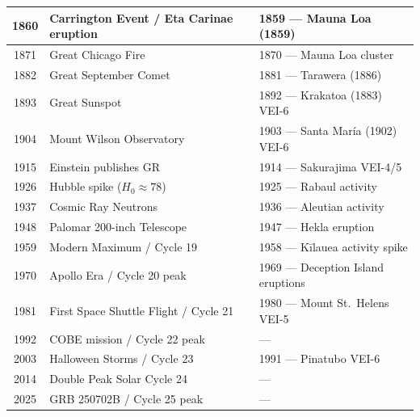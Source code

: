 \documentclass[11pt,a4paper]{article}
\begin{document}
\begin{longtable}{|c|p{5cm}|p{5cm}|}
1860 & Carrington Event / Eta Carinae eruption & 1859 --- Mauna Loa (1859) \\ \hline
1871 & Great Chicago Fire & 1870 --- Mauna Loa cluster \\ \hline
1882 & Great September Comet & 1881 --- Tarawera (1886) \\ \hline
1893 & Great Sunspot & 1892 --- Krakatoa (1883) VEI-6 \\ \hline
1904 & Mount Wilson Observatory & 1903 --- Santa María (1902) VEI-6 \\ \hline
1915 & Einstein publishes GR & 1914 --- Sakurajima VEI-4/5 \\ \hline
1926 & Hubble spike ($H_0\approx78$) & 1925 --- Rabaul activity \\ \hline
1937 & Cosmic Ray Neutrons & 1936 --- Aleutian activity \\ \hline
1948 & Palomar 200-inch Telescope & 1947 --- Hekla eruption \\ \hline
1959 & Modern Maximum / Cycle 19 & 1958 --- Kīlauea activity spike \\ \hline
1970 & Apollo Era / Cycle 20 peak & 1969 --- Deception Island eruptions \\ \hline
1981 & First Space Shuttle Flight / Cycle 21 & 1980 --- Mount St.\ Helens VEI-5 \\ \hline
1992 & COBE mission / Cycle 22 peak & --- \\ \hline
2003 & Halloween Storms / Cycle 23 & 1991 --- Pinatubo VEI-6 \\ \hline
2014 & Double Peak Solar Cycle 24 & --- \\ \hline
2025 & GRB 250702B / Cycle 25 peak & --- \\ \hline
\end{longtable}
\end{document}
